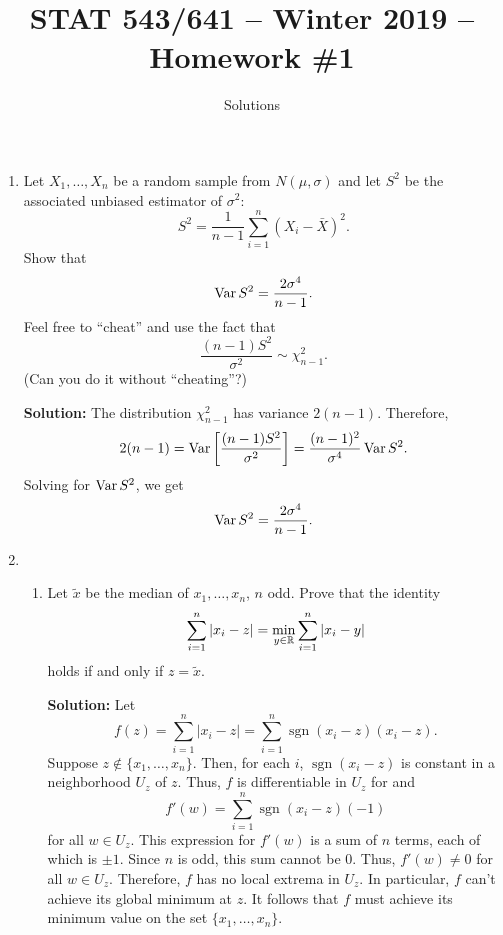 \documentclass[12pt]{amsart}
\newcommand{\sol}{\bigskip\noindent\textbf{Solution: }}
\DeclareMathOperator{\sgn}{sgn}
\begin{document}
    \title{STAT 543/641 -- Winter 2019 -- Homework \#1}

    \author{Solutions}
    \maketitle

    \begin{enumerate}
        \setlength\itemsep{1em}
        \item 
        Let $X_1,\ldots,X_n$ be a random sample from $N(\mu, \sigma)$ and let $S^2$ be
        the associated unbiased estimator of $\sigma^2$:
        \[
            S^2 = \frac1{n-1}\sum_{i=1}^n (X_i-\bar X)^2.
        \]
        Show that
        \[\operatorname{Var} S^2 = \dfrac{2\sigma^4}{n-1}.\]
        Feel free to ``cheat'' and use the fact that
        \[\frac{(n-1)S^2}{\sigma^2}\sim\chi^2_{n-1}.\]
        (Can you do it without ``cheating''?)


        \sol
        The distribution $\chi^2_{n-1}$ has variance $2(n-1)$. Therefore,
        \[
            2(n-1) = \operatorname{Var}\left[\frac{(n-1)S^2}{\sigma^2}\right] = \frac{(n-1)^2}{\sigma^4}\operatorname{Var} S^2.
        \]
        Solving for $\operatorname{Var} S^2$, we get
        \[\operatorname{Var} S^2 = \dfrac{2\sigma^4}{n-1}.\]



        \item 
        \begin{enumerate}
            \setlength{\itemsep}{0.5em}
            \item Let $\tilde{x}$ be the median of $x_1,\ldots,x_n$, $n$ odd. Prove that the identity
            \[\sum_{i=1}^n|x_i-z| = \min_{y\in\mathbb{R}} \sum_{i=1}^n|x_i-y|\]
            holds if and only if $z=\tilde x$.
            
            \sol
            Let
            \[
                f(z) = \sum_{i=1}^n|x_i-z| = \sum_{i=1}^n\sgn(x_i-z)(x_i-z).
            \]
            Suppose $z\notin\{x_1,\ldots,x_n\}$. Then, for each $i$, $\sgn(x_i-z)$ is 
            constant in a neighborhood $U_z$ of $z$. Thus, $f$ is differentiable in $U_z$
            for and
            \[
                f'(w) = \sum_{i=1}^n\sgn(x_i-z)(-1)
            \]
            for all $w\in U_z$. This expression for $f'(w)$ is a sum of $n$ terms, each of which is $\pm 1$.
            Since $n$ is odd, this sum cannot be $0$. Thus, $f'(w)\neq 0$ for all $w\in U_z$.
            Therefore, $f$ has no local extrema in $U_z$.
            In particular, $f$ can't achieve its global minimum at $z$.
            It follows that $f$ must achieve its minimum value on the set $\{x_1,\ldots,x_n\}$.


\end{enumerate}
\end{enumerate}
\end{document}
